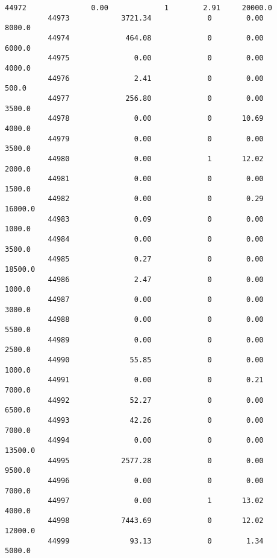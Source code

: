\documentclass[11pt]{article}
\begin{document}
\begin{Verbatim}[commandchars=\\\{\}]
          44972               0.00             1        2.91     20000.0   
          44973            3721.34             0        0.00      8000.0   
          44974             464.08             0        0.00      6000.0   
          44975               0.00             0        0.00      4000.0   
          44976               2.41             0        0.00       500.0   
          44977             256.80             0        0.00      3500.0   
          44978               0.00             0       10.69      4000.0   
          44979               0.00             0        0.00      3500.0   
          44980               0.00             1       12.02      2000.0   
          44981               0.00             0        0.00      1500.0   
          44982               0.00             0        0.29     16000.0   
          44983               0.09             0        0.00      1000.0   
          44984               0.00             0        0.00      3500.0   
          44985               0.27             0        0.00     18500.0   
          44986               2.47             0        0.00      1000.0   
          44987               0.00             0        0.00      3000.0   
          44988               0.00             0        0.00      5500.0   
          44989               0.00             0        0.00      2500.0   
          44990              55.85             0        0.00      1000.0   
          44991               0.00             0        0.21      7000.0   
          44992              52.27             0        0.00      6500.0   
          44993              42.26             0        0.00      7000.0   
          44994               0.00             0        0.00     13500.0   
          44995            2577.28             0        0.00      9500.0   
          44996               0.00             0        0.00      7000.0   
          44997               0.00             1       13.02      4000.0   
          44998            7443.69             0       12.02     12000.0   
          44999              93.13             0        1.34      5000.0   
          

\end{Verbatim}
\end{document}
